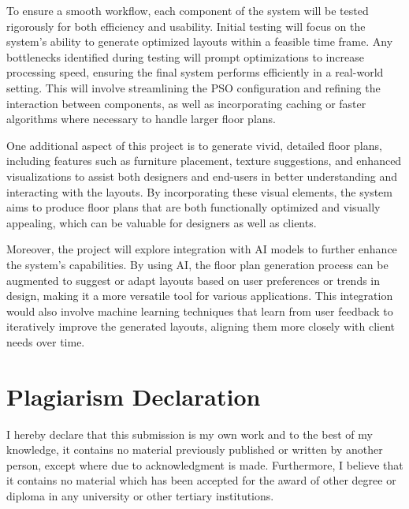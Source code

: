 \documentclass[]{article}
\begin{document}
To ensure a smooth workflow, each component of the system will be tested rigorously for both efficiency and usability. Initial testing will focus on the system’s ability to generate optimized layouts within a feasible time frame. Any bottlenecks identified during testing will prompt optimizations to increase processing speed, ensuring the final system performs efficiently in a real-world setting. This will involve streamlining the PSO configuration and refining the interaction between components, as well as incorporating caching or faster algorithms where necessary to handle larger floor plans.

One additional aspect of this project is to generate vivid, detailed floor plans, including features such as furniture placement, texture suggestions, and enhanced visualizations to assist both designers and end-users in better understanding and interacting with the layouts. By incorporating these visual elements, the system aims to produce floor plans that are both functionally optimized and visually appealing, which can be valuable for designers as well as clients.

Moreover, the project will explore integration with AI models to further enhance the system’s capabilities. By using AI, the floor plan generation process can be augmented to suggest or adapt layouts based on user preferences or trends in design, making it a more versatile tool for various applications. This integration would also involve machine learning techniques that learn from user feedback to iteratively improve the generated layouts, aligning them more closely with client needs over time.

\section{Plagiarism Declaration}
I hereby declare that this submission is my own work and to the best of my knowledge, it contains no material previously published or written by another person, except where due to acknowledgment is made. Furthermore, I believe that it contains no material which has been accepted for the award of other degree or diploma in any university or other tertiary institutions.




\end{document}
